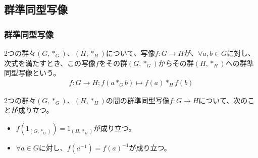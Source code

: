 \documentclass[dvipdfmx]{jsarticle}
\begin{document}
\subsection{群準同型写像}%
\subsubsection{群準同型写像}%
\begin{dfn}
2つの群々$\left( G,*_{G} \right)$、$\left( H,*_{H} \right)$について、写像$f:G \rightarrow H$が、$\forall a,b \in G$に対し、次式を満たすとき、この写像$f$をその群$\left( G,*_{G} \right)$からその群$\left( H,*_{H} \right)$への群準同型写像という。
\begin{align*}
f:G \rightarrow H;f\left( a*_{G}b \right) \mapsto f(a)*_{H}f(b)
\end{align*}
\end{dfn}
\begin{thm}\label{3.1.2.1}
2つの群々$\left( G,*_{G} \right)$、$\left( H,*_{H} \right)$の間の群準同型写像$f:G \rightarrow H$について、次のことが成り立つ。
\begin{itemize}
\item
  $f\left( 1_{\left( G,*_{G} \right)} \right) = 1_{\left( H,*_{H} \right)}$が成り立つ。
\item
  $\forall a \in G$に対し、$f\left( a^{- 1} \right) = {f(a)}^{- 1}$が成り立つ。
\end{itemize}
\end{thm}
\end{document}
